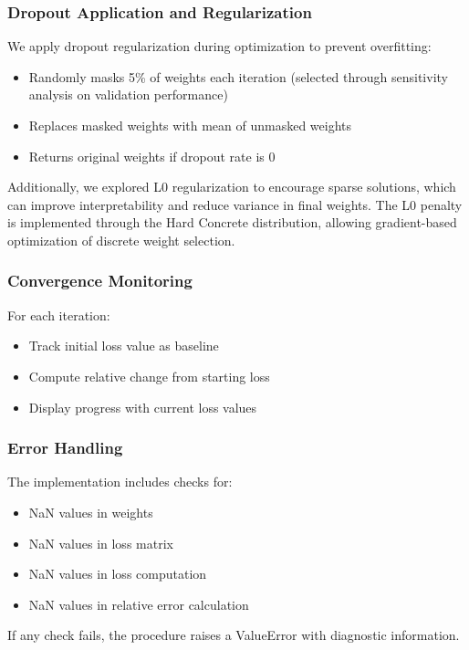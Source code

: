 \subsubsection{Dropout Application and Regularization}

We apply dropout regularization during optimization to prevent overfitting:
\begin{itemize}
    \item Randomly masks 5\% of weights each iteration (selected through sensitivity analysis on validation performance)
    \item Replaces masked weights with mean of unmasked weights
    \item Returns original weights if dropout rate is 0
\end{itemize}

Additionally, we explored L0 regularization to encourage sparse solutions, which can improve interpretability and reduce variance in final weights. The L0 penalty is implemented through the Hard Concrete distribution, allowing gradient-based optimization of discrete weight selection.

\subsubsection{Convergence Monitoring}

For each iteration:
\begin{itemize}
    \item Track initial loss value as baseline
    \item Compute relative change from starting loss
    \item Display progress with current loss values
\end{itemize}

\subsubsection{Error Handling}

The implementation includes checks for:
\begin{itemize}
    \item NaN values in weights
    \item NaN values in loss matrix
    \item NaN values in loss computation
    \item NaN values in relative error calculation
\end{itemize}

If any check fails, the procedure raises a ValueError with diagnostic information.

